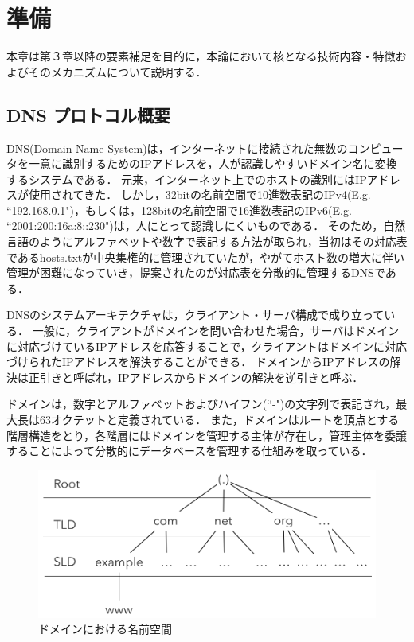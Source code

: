 \section{準備}
本章は第３章以降の要素補足を目的に，本論において核となる技術内容・特徴およびそのメカニズムについて説明する．
\subsection{DNS プロトコル概要}
\label{sec:dns-protocol}
DNS(Domain Name System)は，インターネットに接続された無数のコンピュータを一意に識別するためのIPアドレスを，人が認識しやすいドメイン名に変換するシステムである．
元来，インターネット上でのホストの識別にはIPアドレスが使用されてきた．
しかし，32bitの名前空間で10進数表記のIPv4(E.g. ``192.168.0.1")，もしくは，128bitの名前空間で16進数表記のIPv6(E.g. ``2001:200:16a:8::230")は，人にとって認識しにくいものである．
そのため，自然言語のようにアルファベットや数字で表記する方法が取られ，当初はその対応表であるhosts.txtが中央集権的に管理されていたが，やがてホスト数の増大に伴い管理が困難になっていき，提案されたのが対応表を分散的に管理するDNSである．

DNSのシステムアーキテクチャは，クライアント・サーバ構成で成り立っている．
一般に，クライアントがドメインを問い合わせた場合，サーバはドメインに対応づけているIPアドレスを応答することで，クライアントはドメインに対応づけられたIPアドレスを解決することができる．
ドメインからIPアドレスの解決は正引きと呼ばれ，IPアドレスからドメインの解決を逆引きと呼ぶ．

ドメインは，数字とアルファベットおよびハイフン(``-")の文字列で表記され，最大長は63オクテットと定義されている．
また，ドメインはルートを頂点とする階層構造をとり，各階層にはドメインを管理する主体が存在し，管理主体を委譲することによって分散的にデータベースを管理する仕組みを取っている．

\begin{figure}[h]
 \centering
 \includegraphics[width=12.0cm]{figure/dns-architecture.png}
 \caption{ドメインにおける名前空間}
 \label{fig:dns-architecture}
\end{figure}

